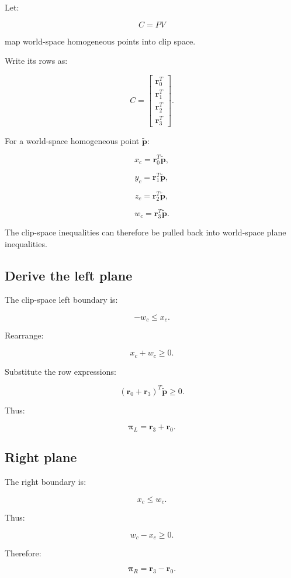 Let:

\[
 \boxed{ C=PV }
\]

map world-space homogeneous points into clip space.

Write its rows as:

\[
 C= \begin{bmatrix} \mathbf r_0^T\\ \mathbf r_1^T\\ \mathbf r_2^T\\ \mathbf r_3^T \end{bmatrix}.
\]

For a world-space homogeneous point \(\tilde{\mathbf p}\):

\[
 x_c=\mathbf r_0^T\tilde{\mathbf p},
\]

\[
 y_c=\mathbf r_1^T\tilde{\mathbf p},
\]

\[
 z_c=\mathbf r_2^T\tilde{\mathbf p},
\]

\[
 w_c=\mathbf r_3^T\tilde{\mathbf p}.
\]

The clip-space inequalities can therefore be pulled back into world-space plane inequalities.

\subsection{Derive the left plane}\label{02-foundations-ii-ch034-derive-the-left-plane}

The clip-space left boundary is:

\[
 -w_c\le x_c.
\]

Rearrange:

\[
 x_c+w_c\ge0.
\]

Substitute the row expressions:

\[
 (\mathbf r_0+\mathbf r_3)^T\tilde{\mathbf p}\ge0.
\]

Thus:

\[
 \boxed{ \boldsymbol\pi_L=\mathbf r_3+\mathbf r_0 }.
\]

\subsection{Right plane}\label{02-foundations-ii-ch034-right-plane}

The right boundary is:

\[
 x_c\le w_c.
\]

Thus:

\[
 w_c-x_c\ge0.
\]

Therefore:

\[
 \boxed{ \boldsymbol\pi_R=\mathbf r_3-\mathbf r_0 }.
\]

